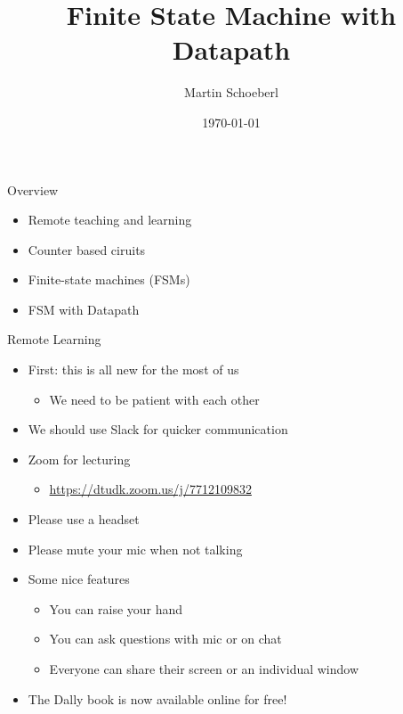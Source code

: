 

\newif\ifbook


\title{Finite State Machine with Datapath}
\author{Martin Schoeberl}
\date{\today}



\begin{frame}
\titlepage
\end{frame}

\begin{frame}[fragile]{Overview}
\begin{itemize}
\item Remote teaching and learning
\item Counter based ciruits
\item Finite-state machines (FSMs) 
\item FSM with Datapath
\end{itemize}
\end{frame}

\begin{frame}[fragile]{Remote Learning}
\begin{itemize}
\item First: this is all new for the most of us
\begin{itemize}
\item We need to be patient with each other
\end{itemize}
\item We should use Slack for quicker communication
\item Zoom for lecturing
\begin{itemize}
\item \url{https://dtudk.zoom.us/j/7712109832}
\end{itemize}
\item Please use a headset
\item Please mute your mic when not talking
\item Some nice features
\begin{itemize}
\item You can raise your hand
\item You can ask questions with mic or on chat
\item Everyone can share their screen or an individual window
\end{itemize}
\item The Dally book is now available online for free!
\end{itemize}
\end{frame}


